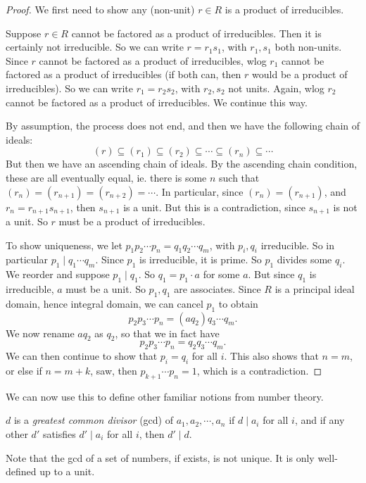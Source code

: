 \documentclass[a4paper]{article}
\begin{document}
\begin{proof}
  We first need to show any (non-unit) $r \in R$ is a product of irreducibles.

  Suppose $r \in R$ cannot be factored as a product of irreducibles. Then it is certainly not irreducible. So we can write $r = r_1 s_1$, with $r_1, s_1$ both non-units. Since $r$ cannot be factored as a product of irreducibles, wlog $r_1$ cannot be factored as a product of irreducibles (if both can, then $r$ would be a product of irreducibles). So we can write $r_1 = r_2 s_2$, with $r_2, s_2$ not units. Again, wlog $r_2$ cannot be factored as a product of irreducibles. We continue this way.

  By assumption, the process does not end, and then we have the following chain of ideals:
  \[
    (r) \subseteq (r_1) \subseteq (r_2) \subseteq \cdots \subseteq (r_n) \subseteq \cdots
  \]
  But then we have an ascending chain of ideals. By the ascending chain condition, these are all eventually equal, ie. there is some $n$ such that $(r_n) = (r_{n + 1}) = (r_{n + 2}) =\cdots$. In particular, since $(r_n) = (r_{n + 1})$, and $r_n = r_{n + 1} s_{n + 1}$, then $s_{n + 1}$ is a unit. But this is a contradiction, since $s_{n + 1}$ is not a unit. So $r$ must be a product of irreducibles.

  To show uniqueness, we let $p_1p_2 \cdots p_n= q_1 q_2 \cdots q_m$, with $p_i, q_i$ irreducible. So in particular $p_1 \mid q_1 \cdots q_m$. Since $p_1$ is irreducible, it is prime. So $p_1$ divides some $q_i$. We reorder and suppose $p_1 \mid q_1$. So $q_1 = p_1 \cdot a$ for some $a$. But since $q_1$ is irreducible, $a$ must be a unit. So $p_1, q_1$ are associates. Since $R$ is a principal ideal domain, hence integral domain, we can cancel $p_1$ to obtain
  \[
    p_2p_3 \cdots p_n = (a q_2) q_3 \cdots q_m.
  \]
  We now rename $aq_2$ as $q_2$, so that we in fact have
  \[
    p_2p_3 \cdots p_n = q_2 q_3 \cdots q_m.
  \]
  We can then continue to show that $p_i = q_i$ for all $i$. This also shows that $n = m$, or else if $n = m + k$, saw, then $p_{k + 1} \cdots p_n = 1$, which is a contradiction.
\end{proof}

We can now use this to define other familiar notions from number theory.
\begin{defi}
  $d$ is a \emph{greatest common divisor} (gcd) of $a_1,a_2, \cdots, a_n$ if $d \mid a_i$ for all $i$, and if any other $d'$ satisfies $d' \mid a_i$ for all $i$, then $d' \mid d$.
\end{defi}
Note that the gcd of a set of numbers, if exists, is not unique. It is only well-defined up to a unit.
\end{document}
